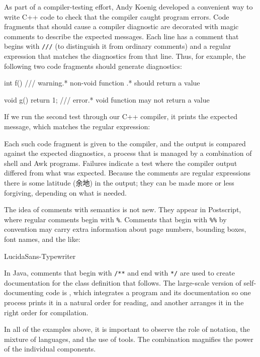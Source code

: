 As part of a compiler-testing effort, Andy Koenig developed a convenient
way to write C++ code to check that the compiler caught program errors.
Code fragments that should cause a compiler diagnostic are decorated with
magic comments to describe the expected messages. Each line has a comment
that begins with \verb'///' (to distinguish it from ordinary comments) and
a regular expression that matches the diagnostics from that line. Thus, for
example, the following two code fragments should generate diagnostics:
\begin{wellcode}
    int f() {}
        /// warning.* non-void function .* should return a value

    void g() { return 1; }
        /// error.* void function may not return a value
\end{wellcode}
If we run the second test through our C++ compiler, it prints the expected
message, which matches the regular expression:

Each such code fragment is given to the compiler, and the output is
compared against the expected diagnostics, a process that is managed by a
combination of shell and Awk programs. Failures indicate a test where the
compiler output differed from what was expected. Because the comments are
regular expressions there is some latitude (余地) in the output; they can
be made more or less forgiving, depending on what is needed.

The idea of comments with semantics is not new. They appear in Postscript,
where regular comments begin with \verb'%'. Comments that begin with
\verb'%%' by convention may carry extra information about page numbers,
bounding boxes, font names, and the like:
\begin{wellcode}
                LucidaSans-Typewriter
\end{wellcode}
In Java, comments that begin with \verb'/**' and end with \verb'*/' are
used to create documentation for the class definition that follows. The
large-scale version of self-documenting code is , which integrates a program and its documentation so one
process prints it in a natural order for reading, and another arranges it
in the right order for compilation.

In all of the examples above, it is important to observe the role of
notation, the mixture of languages, and the use of tools. The combination
magnifies the power of the individual components.

